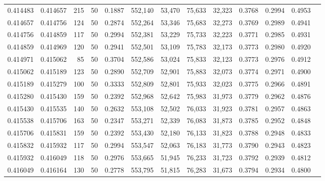 \begin{tabular}{rrrrrrrrrrrrr}
0.414483 & 0.414657 &   215 &  50 &                                     0.1887 & 552,140 &  53,470 &  75,633 &  32,323 & 0.3768 & 0.2994 & 0.4953 \\
0.414657 & 0.414756 &   124 &  50 &                                     0.2874 & 552,264 &  53,346 &  75,683 &  32,273 & 0.3769 & 0.2989 & 0.4941 \\
0.414756 & 0.414859 &   117 &  50 &                                     0.2994 & 552,381 &  53,229 &  75,733 &  32,223 & 0.3771 & 0.2985 & 0.4931 \\
0.414859 & 0.414969 &   120 &  50 &                                     0.2941 & 552,501 &  53,109 &  75,783 &  32,173 & 0.3773 & 0.2980 & 0.4920 \\
0.414971 & 0.415062 &    85 &  50 &                                     0.3704 & 552,586 &  53,024 &  75,833 &  32,123 & 0.3773 & 0.2976 & 0.4912 \\
0.415062 & 0.415189 &   123 &  50 &                                     0.2890 & 552,709 &  52,901 &  75,883 &  32,073 & 0.3774 & 0.2971 & 0.4900 \\
0.415189 & 0.415279 &   100 &  50 &                                     0.3333 & 552,809 &  52,801 &  75,933 &  32,023 & 0.3775 & 0.2966 & 0.4891 \\
0.415280 & 0.415430 &   159 &  50 &                                     0.2392 & 552,968 &  52,642 &  75,983 &  31,973 & 0.3779 & 0.2962 & 0.4876 \\
0.415430 & 0.415535 &   140 &  50 &                                     0.2632 & 553,108 &  52,502 &  76,033 &  31,923 & 0.3781 & 0.2957 & 0.4863 \\
0.415538 & 0.415706 &   163 &  50 &                                     0.2347 & 553,271 &  52,339 &  76,083 &  31,873 & 0.3785 & 0.2952 & 0.4848 \\
0.415706 & 0.415831 &   159 &  50 &                                     0.2392 & 553,430 &  52,180 &  76,133 &  31,823 & 0.3788 & 0.2948 & 0.4833 \\
0.415832 & 0.415932 &   117 &  50 &                                     0.2994 & 553,547 &  52,063 &  76,183 &  31,773 & 0.3790 & 0.2943 & 0.4823 \\
0.415932 & 0.416049 &   118 &  50 &                                     0.2976 & 553,665 &  51,945 &  76,233 &  31,723 & 0.3792 & 0.2939 & 0.4812 \\
0.416049 & 0.416164 &   130 &  50 &                                     0.2778 & 553,795 &  51,815 &  76,283 &  31,673 & 0.3794 & 0.2934 & 0.4800 \\

\end{tabular}
